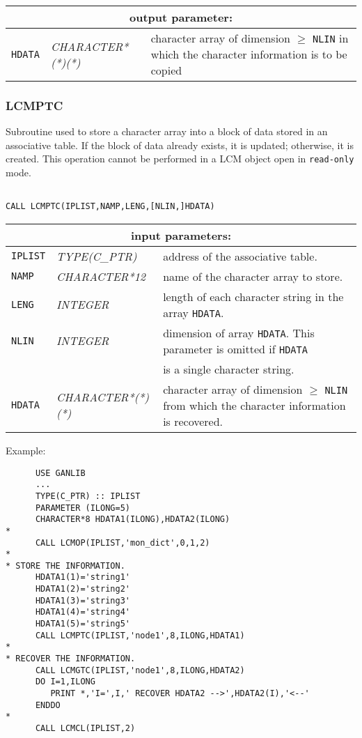 \vskip 0.8cm

\noindent
\begin{tabular}{|p{1.5cm}|p{3.5cm}|p{9.5cm}|}
\hline
\multicolumn{3}{|c|}{\bf output parameter:} \\
\hline
{\tt HDATA} & {\it CHARACTER*(*)(*)} & character array of dimension $\ge$ {\tt NLIN} in which the character information is to be copied \\
\hline
\end{tabular}

\subsubsection{LCMPTC}\label{sect:LCMPTC}

Subroutine used to store a character array into a block of data stored in an associative table.
If the block of data already exists, it is updated; otherwise, it is created. This operation cannot be performed
in a LCM object open in {\tt read-only} mode.

\begin{verbatim}

CALL LCMPTC(IPLIST,NAMP,LENG,[NLIN,]HDATA)
\end{verbatim}

\noindent
\begin{tabular}{|p{1.5cm}|p{3.5cm}|p{9.5cm}|}
\hline
\multicolumn{3}{|c|}{\bf input parameters:} \\
\hline
{\tt IPLIST} & {\it TYPE(C\_PTR)} & address of the associative table. \\
\hline
{\tt NAMP} & {\it CHARACTER*12} & name of the character array
to store. \\
\hline
{\tt LENG} & {\it INTEGER} & length of each character string in the array {\tt HDATA}. \\
\hline
{\tt NLIN} & {\it INTEGER} & dimension of array {\tt HDATA}. This parameter is omitted if {\tt HDATA} \\
& & is a single character string. \\
\hline
{\tt HDATA} & {\it CHARACTER*(*)(*)} & character array of dimension $\ge$ {\tt NLIN} from which the character information is recovered. \\
\hline
\end{tabular}

\vskip 0.4cm
\goodbreak

\noindent Example:
\begin{verbatim}
      USE GANLIB
      ...
      TYPE(C_PTR) :: IPLIST
      PARAMETER (ILONG=5)
      CHARACTER*8 HDATA1(ILONG),HDATA2(ILONG)
*
      CALL LCMOP(IPLIST,'mon_dict',0,1,2)
*
* STORE THE INFORMATION.
      HDATA1(1)='string1'
      HDATA1(2)='string2'
      HDATA1(3)='string3'
      HDATA1(4)='string4'
      HDATA1(5)='string5'
      CALL LCMPTC(IPLIST,'node1',8,ILONG,HDATA1)
*
* RECOVER THE INFORMATION.
      CALL LCMGTC(IPLIST,'node1',8,ILONG,HDATA2)
      DO I=1,ILONG
         PRINT *,'I=',I,' RECOVER HDATA2 -->',HDATA2(I),'<--'
      ENDDO
*
      CALL LCMCL(IPLIST,2)
\end{verbatim}

